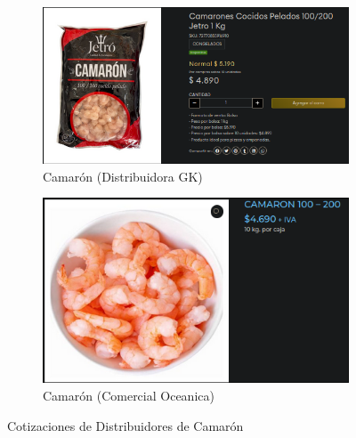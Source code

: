 \documentclass[12pt]{article}
\begin{document}
        \begin{figure}[h!] %
            \centering
            \begin{subfigure}{0.45\textwidth}
                \centering
                \includegraphics[width=0.9\linewidth]{gk} %
                \caption{Camarón (Distribuidora GK)}
                \label{fig:distribuidora_gk}
            \end{subfigure}
            \hfill
            \begin{subfigure}{0.45\textwidth}
                \centering
                \includegraphics[width=0.9\linewidth]{oceanic} %
                \caption{Camarón (Comercial Oceanica)}
                \label{fig:comercial_oceanica}
            \end{subfigure}
            \caption{Cotizaciones de Distribuidores de Camarón}
            \label{fig:cotizaciones_camaron}
        \end{figure} %
\end{document}
